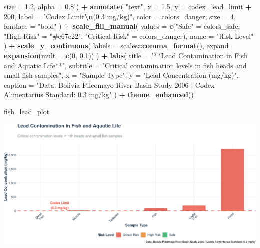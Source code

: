 \documentclass[
]{article}
\newenvironment{Shaded}{\begin{snugshade}}{\end{snugshade}}
\newcommand{\AttributeTok}[1]{\textcolor[rgb]{0.13,0.29,0.53}{#1}}
\newcommand{\DecValTok}[1]{\textcolor[rgb]{0.00,0.00,0.81}{#1}}
\newcommand{\FloatTok}[1]{\textcolor[rgb]{0.00,0.00,0.81}{#1}}
\newcommand{\FunctionTok}[1]{\textcolor[rgb]{0.13,0.29,0.53}{\textbf{#1}}}
\newcommand{\NormalTok}[1]{#1}
\newcommand{\OtherTok}[1]{\textcolor[rgb]{0.56,0.35,0.01}{#1}}
\newcommand{\SpecialCharTok}[1]{\textcolor[rgb]{0.81,0.36,0.00}{\textbf{#1}}}
\newcommand{\StringTok}[1]{\textcolor[rgb]{0.31,0.60,0.02}{#1}}
\begin{document}
\begin{Shaded}
\begin{Highlighting}[]
    \AttributeTok{size =} \FloatTok{1.2}\NormalTok{,}
    \AttributeTok{alpha =} \FloatTok{0.8}
\NormalTok{  ) }\SpecialCharTok{+}
  \FunctionTok{annotate}\NormalTok{(}
    \StringTok{"text"}\NormalTok{,}
    \AttributeTok{x =} \FloatTok{1.5}\NormalTok{, }\AttributeTok{y =}\NormalTok{ codex\_lead\_limit }\SpecialCharTok{+} \DecValTok{200}\NormalTok{,}
    \AttributeTok{label =} \StringTok{"Codex Limit}\SpecialCharTok{\textbackslash{}n}\StringTok{(0.3 mg/kg)"}\NormalTok{,}
    \AttributeTok{color =}\NormalTok{ colors\_danger,}
    \AttributeTok{size =} \DecValTok{4}\NormalTok{,}
    \AttributeTok{fontface =} \StringTok{"bold"}
\NormalTok{  ) }\SpecialCharTok{+}
  \FunctionTok{scale\_fill\_manual}\NormalTok{(}
    \AttributeTok{values =} \FunctionTok{c}\NormalTok{(}\StringTok{"Safe"} \OtherTok{=}\NormalTok{ colors\_safe, }
               \StringTok{"High Risk"} \OtherTok{=} \StringTok{"\#e67e22"}\NormalTok{, }
               \StringTok{"Critical Risk"} \OtherTok{=}\NormalTok{ colors\_danger),}
    \AttributeTok{name =} \StringTok{"Risk Level"}
\NormalTok{  ) }\SpecialCharTok{+}
  \FunctionTok{scale\_y\_continuous}\NormalTok{(}
    \AttributeTok{labels =}\NormalTok{ scales}\SpecialCharTok{::}\FunctionTok{comma\_format}\NormalTok{(),}
    \AttributeTok{expand =} \FunctionTok{expansion}\NormalTok{(}\AttributeTok{mult =} \FunctionTok{c}\NormalTok{(}\DecValTok{0}\NormalTok{, }\FloatTok{0.1}\NormalTok{))}
\NormalTok{  ) }\SpecialCharTok{+}
  \FunctionTok{labs}\NormalTok{(}
    \AttributeTok{title =} \StringTok{"**Lead Contamination in Fish and Aquatic Life**"}\NormalTok{,}
    \AttributeTok{subtitle =} \StringTok{"Critical contamination levels in fish heads and small fish samples"}\NormalTok{,}
    \AttributeTok{x =} \StringTok{"Sample Type"}\NormalTok{,}
    \AttributeTok{y =} \StringTok{"Lead Concentration (mg/kg)"}\NormalTok{,}
    \AttributeTok{caption =} \StringTok{"Data: Bolivia Pilcomayo River Basin Study 2006 | Codex Alimentarius Standard: 0.3 mg/kg"}
\NormalTok{  ) }\SpecialCharTok{+}
  \FunctionTok{theme\_enhanced}\NormalTok{()}

\NormalTok{fish\_lead\_plot}
\end{Highlighting}
\end{Shaded}

\includegraphics{WHO_standards_pdf_02_files/figure-latex/fish-lead-1.pdf}
\end{document}
